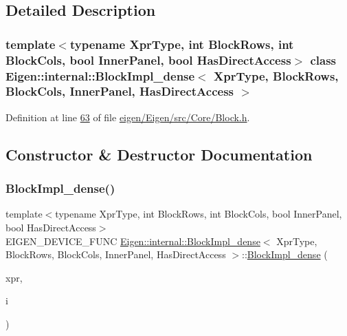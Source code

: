 \subsection{Detailed Description}
\subsubsection*{template$<$typename Xpr\+Type, int Block\+Rows, int Block\+Cols, bool Inner\+Panel, bool Has\+Direct\+Access$>$\newline
class Eigen\+::internal\+::\+Block\+Impl\+\_\+dense$<$ Xpr\+Type, Block\+Rows, Block\+Cols, Inner\+Panel, Has\+Direct\+Access $>$}



Definition at line \hyperlink{eigen_2_eigen_2src_2_core_2_block_8h_source_l00063}{63} of file \hyperlink{eigen_2_eigen_2src_2_core_2_block_8h_source}{eigen/\+Eigen/src/\+Core/\+Block.\+h}.



\subsection{Constructor \& Destructor Documentation}
\mbox{\label{class_eigen_1_1internal_1_1_block_impl__dense_af68c0eafb607bb884cfe507bee39052e}} 
\subsubsection{\texorpdfstring{Block\+Impl\+\_\+dense()}{BlockImpl\_dense()}\hspace{0.1cm}{\footnotesize\ttfamily [1/6]}}
{\footnotesize\ttfamily template$<$typename Xpr\+Type, int Block\+Rows, int Block\+Cols, bool Inner\+Panel, bool Has\+Direct\+Access$>$ \\
E\+I\+G\+E\+N\+\_\+\+D\+E\+V\+I\+C\+E\+\_\+\+F\+U\+NC \hyperlink{class_eigen_1_1internal_1_1_block_impl__dense}{Eigen\+::internal\+::\+Block\+Impl\+\_\+dense}$<$ Xpr\+Type, Block\+Rows, Block\+Cols, Inner\+Panel, Has\+Direct\+Access $>$\+::\hyperlink{class_eigen_1_1internal_1_1_block_impl__dense}{Block\+Impl\+\_\+dense} (\begin{DoxyParamCaption}\item[{Xpr\+Type \&}]{xpr,  }\item[{\hyperlink{namespace_eigen_a62e77e0933482dafde8fe197d9a2cfde}{Index}}]{i }\end{DoxyParamCaption})\hspace{0.3cm}{\ttfamily [inline]}}

